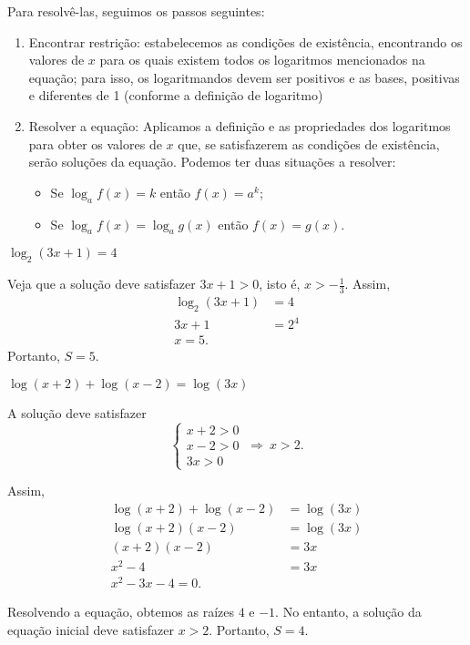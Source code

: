 Para resolvê-las, seguimos os passos 
seguintes:
\begin{enumerate}
    \item Encontrar restrição: estabelecemos as condições de existência, encontrando os valores de $x$ para os quais existem todos os logaritmos mencionados na equação; para isso, os logaritmandos devem ser positivos e as bases, positivas e diferentes de 1 (conforme a definição de logaritmo)
    \item Resolver a equação: Aplicamos a definição e as propriedades dos logaritmos para obter os valores de $x$ que, se satisfazerem as condições de existência, serão soluções da equação. Podemos ter duas situações a resolver:
    \begin{itemize}
        \item Se $\log_a f(x) = k $ então $ f(x)=a^k$;
        \item Se $\log_a f(x) = \log_a g(x) $ então $ f(x)=g(x)$.
    \end{itemize}
\end{enumerate}

\begin{exem}
    $\log_2 (3x+1) = 4$
    
    Veja que a solução deve satisfazer $3x+1>0$, isto é, $x>-\frac{1}{3}$. Assim,
    \begin{align*}
        \log_2 (3x+1) &= 4\\
        3x+1&=2^4\\
        x=5.
    \end{align*}
    Portanto, $S={5}$.
\end{exem}

\begin{exem}
    $\log (x+2) + \log(x-2) = \log (3x)$
    
    A solução deve satisfazer 
    \begin{equation*}
        \left\{
        \begin{matrix}
            x+2>0\\
            x-2>0\\
            3x>0
        \end{matrix}
        \right.
        \ \Rightarrow \ 
        x>2.
    \end{equation*}
    
    Assim,
    \begin{align*}
        \log (x+2) + \log(x-2) &= \log (3x)\\
        \log (x+2)(x-2) &= \log (3x)\\
        (x+2)(x-2) &= 3x\\
        x^2-4&=3x\\
        x^2-3x-4=0.
    \end{align*}

    Resolvendo a equação, obtemos as raízes $4$ e $-1$. No entanto, a solução da equação inicial deve satisfazer $x>2$. Portanto, $S={4}$.
\end{exem}

